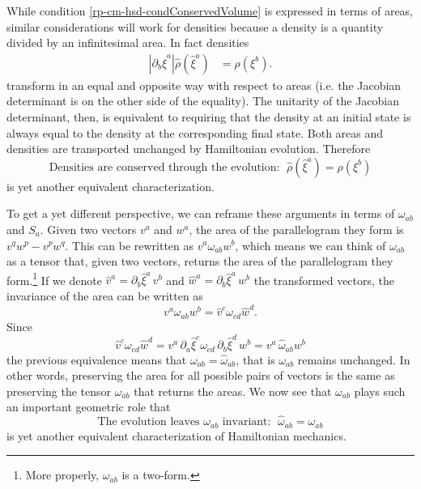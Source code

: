While condition \ref{rp-cm-hsd-condConservedVolume} is expressed in terms of areas, similar considerations will work for densities because a density is a quantity divided by an infinitesimal area. In fact densities
\begin{equation}\label{rp-cm-densityTransformation1d}
	\begin{aligned}
		\left| \partial_b \hat{\xi}^a \right| \hat{\rho}(\hat{\xi}^a) &= \rho(\xi^b).
	\end{aligned}	
\end{equation}
transform in an equal and opposite way with respect to areas (i.e. the Jacobian determinant is on the other side of the equality). The unitarity of the Jacobian determinant, then, is equivalent to requiring that the density at an initial state is always equal to the density at the corresponding final state. Both areas and densities are transported unchanged by Hamiltonian evolution. Therefore
\begin{equation}\label{rp-cm-hsd-condConservedDensity}
	\tag{HM-5}
	\text{Densities are conserved through the evolution: } \; \hat{\rho}(\hat{\xi}^a) = \rho(\xi^b)
\end{equation}
is yet another equivalent characterization.

To get a yet different perspective, we can reframe these arguments in terms of $\omega_{ab}$ and $S_a$. Given two vectors $v^a$ and $w^a$, the area of the parallelogram they form is $v^q w^p - v^p w^q$. This can be rewritten as $v^a \omega_{ab} w^b$, which means we can think of $\omega_{ab}$ as a tensor that, given two vectors, returns the area of the parallelogram they form.\footnote{More properly, $\omega_{ab}$ is a two-form.} If we denote $\hat{v}^a = \partial_b \hat{\xi}^a \, v^b$ and $\hat{w}^a = \partial_b \hat{\xi}^a \, w^b$ the transformed vectors, the invariance of the area can be written as
\begin{equation}
	v^a \omega_{ab} w^b = \hat{v}^c \omega_{cd} \hat{w}^d.
\end{equation}
Since
\begin{equation}
	\hat{v}^c \omega_{cd} \hat{w}^d = v^a \, \partial_a \hat{\xi}^c \omega_{cd} \, \partial_b \hat{\xi}^d \, w^b = v^a \, \hat{\omega}_{ab} w^b
\end{equation}
the previous equivalence means that $\omega_{ab} = \hat{\omega}_{ab}$, that is $\omega_{ab}$ remains unchanged. In other words, preserving the area for all possible pairs of vectors is the same as preserving the tensor $\omega_{ab}$ that returns the areas. We now see that $\omega_{ab}$ plays such an important geometric role that
\begin{equation}\label{rp-cm-hsd-condConservedSymplectic}
	\tag{HM-6}
	\text{The evolution leaves $\omega_{ab}$ invariant: } \; \hat{\omega}_{ab} = \omega_{ab}
\end{equation}
is yet another equivalent characterization of Hamiltonian mechanics.


